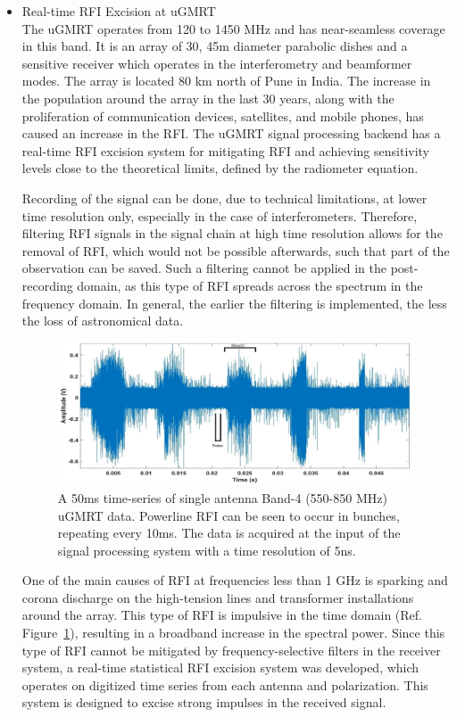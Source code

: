 \begin{itemize}
\item Real-time RFI Excision at uGMRT\\

The uGMRT operates from 120 to 1450 MHz and has near-seamless coverage in this band. It is an array of 30, 45m diameter parabolic dishes and a sensitive receiver which operates in the interferometry and beamformer modes. The array is located 80 km north of Pune in India. The increase in the population around the array in the last 30 years, along with the proliferation of communication devices, satellites, and mobile phones, has caused an increase in the RFI. The uGMRT signal processing backend has a real-time RFI excision system for mitigating RFI and achieving sensitivity levels close to the theoretical limits, defined by the radiometer equation.

Recording of the signal can be done, due to technical limitations, at lower time resolution only, especially in the case of interferometers. Therefore, filtering RFI signals in the signal chain at high time resolution allows for the removal of RFI, which would not be possible afterwards, such that part of the observation can be saved. Such a filtering cannot be applied in the post-recording domain, as this type of RFI spreads across the spectrum in the frequency domain. In general, the earlier the filtering is implemented, the less the loss of astronomical data.

\begin{figure}
    \centering
    \includegraphics[scale=0.7]{Hardware Excision Techniques/figures/Band4_timeseries_ed.jpg}
    \caption{A 50ms time-series of single antenna Band-4 (550-850 MHz) uGMRT data. Powerline RFI can be seen to occur in bunches, repeating every 10ms. The data is acquired at the input of the signal processing system with a time resolution of 5ns.}
    \label{fig:ugmrt-b4-ts}
\end{figure}

One of the main causes of RFI at frequencies less than 1 GHz is sparking and corona discharge on the high-tension lines and transformer installations around the array. This type of RFI is impulsive in the time domain (Ref. Figure~\ref{fig:ugmrt-b4-ts}), resulting in a broadband increase in the spectral power. Since this type of RFI cannot be mitigated by frequency-selective filters in the receiver system, a real-time statistical RFI excision system was developed, which operates on digitized time series from each antenna and polarization. This system is designed to excise strong impulses in the received signal.


\end{itemize}
